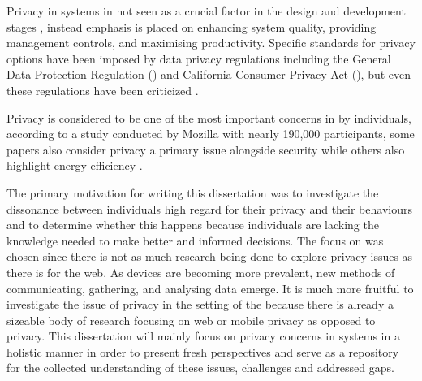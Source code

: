 Privacy in \hyperlink{\acronym}{\acronym} systems in not seen as a crucial factor in the design and
development stages \cite{alhirabi2021security}, instead emphasis is placed
on enhancing system quality, providing management controls, and maximising productivity.
Specific standards for privacy options have been imposed by data privacy
regulations including the General Data Protection Regulation (\hyperlink{\acronym}{\acronym}) and
California Consumer Privacy Act (\hyperlink{\acronym}{\acronym}), but even these regulations have
been criticized \cite{peloquin2020disruptive, gladis2022weaponizing, gentile2022deficient, green2022flaws, byun2019privacy}.

Privacy is considered to be one of the most important concerns in \hyperlink{\acronym}{\acronym} by
individuals, according to a study conducted by Mozilla \cite{Jen2017ten}
with nearly 190,000 participants, some papers \cite{khan2021issues, MOHAMMADZADEH2018124}
also consider privacy a primary issue alongside security while others also highlight
energy efficiency \cite{sisinni2018industrial}.

The primary motivation for writing this dissertation was to investigate
the dissonance between individuals high regard for their privacy
and their behaviours and to determine whether this happens because individuals
are lacking the knowledge needed to make better and informed decisions.
The focus on \hyperlink{\acronym}{\acronym} was chosen since there is not as much research being done to
explore privacy issues as there is for the web. As \hyperlink{\acronym}{\acronym} devices are becoming
more prevalent, new methods of communicating,
gathering, and analysing data emerge.
It is much more fruitful to investigate the issue of privacy in the setting
of the \hyperlink{\acronym}{\acronym} because there is already a sizeable body of research focusing on
web or mobile privacy as opposed to \hyperlink{\acronym}{\acronym} privacy. This dissertation will mainly
focus on privacy concerns in \hyperlink{\acronym}{\acronym} systems in a holistic manner in order to present
fresh perspectives and serve as a repository for the collected understanding of
these issues, challenges and addressed gaps.

